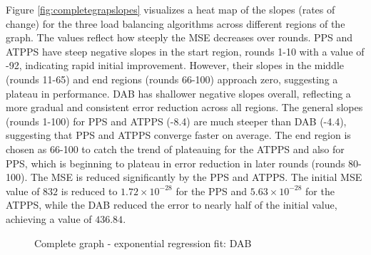 Figure \ref{fig:completegrapslopes} visualizes a heat map of the slopes (rates of change) for the three load balancing algorithms across different regions of the graph. The values reflect how steeply the MSE decreases over rounds. PPS and ATPPS have steep negative slopes in the start region, rounds 1-10 with a value of -92, indicating rapid initial improvement. However, their slopes in the middle (rounds 11-65) and end regions (rounds 66-100) approach zero, suggesting a plateau in performance. DAB has shallower negative slopes overall, reflecting a more gradual and consistent error reduction across all regions. The general slopes (rounds 1-100) for PPS and ATPPS (-8.4) are much steeper than DAB (-4.4), suggesting that PPS and ATPPS converge faster on average. The end region is chosen as 66-100 to catch the trend of plateauing for the ATPPS and also for PPS, which is beginning to plateau in error reduction in later rounds (rounds 80-100). The MSE is reduced significantly by the PPS and ATPPS. The initial MSE value of $832$ is reduced to $1.72 \times 10^{-28}$ for the PPS and $5.63 \times 10^{-28}$ for the ATPPS, while the DAB reduced the error to nearly half of the initial value, achieving a value of $436.84$.

\begin{figure}[]
    \centering
    \caption{Complete graph - exponential regression fit: DAB}
    \label{fig:dabCompleteModelFit}
\end{figure}

